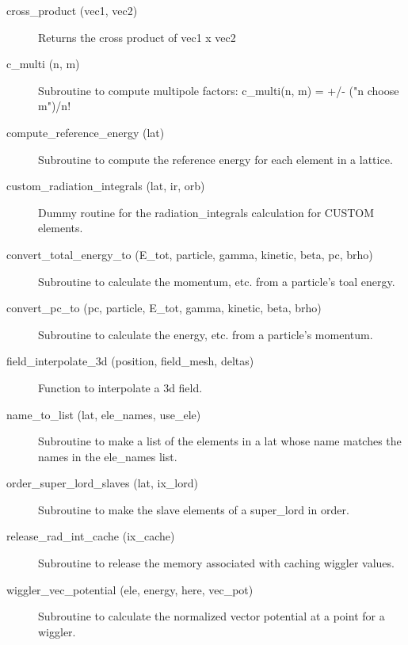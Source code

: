 \begin{description}

\item[cross_product (vec1, vec2)] \Newline 
Returns the cross product of vec1 x vec2

\item[c_multi (n, m)] \Newline
Subroutine to compute multipole factors: 
c_multi(n, m) = +/- ("n choose m")/n! 

\item[compute_reference_energy (lat)] \Newline
Subroutine to compute the reference energy for each element in a lattice. 

\item[custom_radiation_integrals (lat, ir, orb)] \Newline
Dummy routine for the radiation_integrals calculation for CUSTOM elements. 

\item[convert_total_energy_to (E_tot, particle, gamma, kinetic, beta, pc, brho)] \Newline
Subroutine to calculate the momentum, etc. from a particle's toal energy. 

\item[convert_pc_to (pc, particle, E_tot, gamma, kinetic, beta, brho)] \Newline
Subroutine to calculate the energy, etc. from a particle's momentum. 

\item[field_interpolate_3d (position, field_mesh, deltas)] \Newline
Function to interpolate a 3d field. 

\item[name_to_list (lat, ele_names, use_ele)] \Newline
Subroutine to make a list of the elements in a lat 
whose name matches the names in the ele_names list. 

\item[order_super_lord_slaves (lat, ix_lord)] \Newline
Subroutine to make the slave elements of a super_lord in order. 

\item[release_rad_int_cache (ix_cache)] \Newline 
     Subroutine to release the memory associated with caching wiggler values.

\item[wiggler_vec_potential (ele, energy, here, vec_pot)] \Newline
Subroutine to calculate the normalized vector potential at a point for a wiggler.

\end{description}

